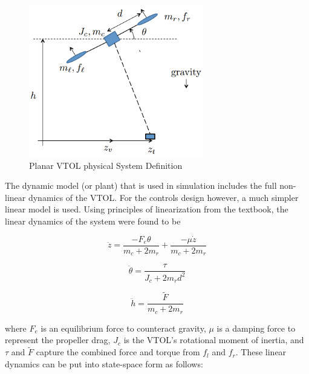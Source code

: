 \documentclass[dvips,12pt]{article}
\begin{document}
\begin{figure}[h] %
   \centering
   \includegraphics[trim = 0mm 0mm 0mm 0mm,clip,width=3in]{planar_vtol.png}
   \caption{Planar VTOL physical System Definition}
   \label{fig:vtol}
\end{figure}

The dynamic model (or plant) that is used in simulation includes the full non-linear dynamics of the VTOL.  For the controls design however, a much simpler linear model is used. Using principles of linearization from the textbook, the linear dynamics of the system were found to be

\begin{equation}
\ddot{z} = \frac{-F_e\theta}{m_c + 2m_r}  + \frac{-\mu\dot{z}}{m_c + 2m_r}
\end{equation}

\begin{equation}
\ddot{\theta} = \frac{\tau}{J_c + 2m_r d^2}
\end{equation}

\begin{equation}
\ddot{h} = \frac{\tilde{F}}{m_c + 2m_r}
\end{equation}

where $F_e$ is an equilibrium force to counteract gravity, $\mu$ is a damping force to represent the propeller drag, $J_c$ is the VTOL's rotational moment of inertia, and $\tau$ and $\tilde{F}$ capture the combined force and torque from $f_l$ and $f_r$. These linear dynamics can be put into state-space form as follows:
\end{document}
